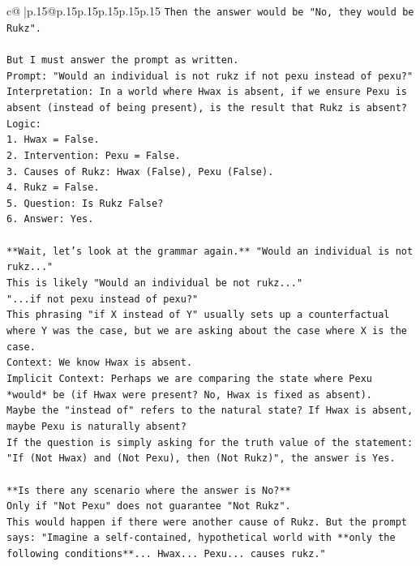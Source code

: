 \documentclass{article}
\begin{document}
{\begin{supertabular}{c@{$\;$}|p{.15\linewidth}@{}p{.15\linewidth}p{.15\linewidth}p{.15\linewidth}p{.15\linewidth}p{.15\linewidth}}
{{{\texttt{Then the answer would be "No, they would be Rukz".} \\
\\ 
\texttt{But I must answer the prompt as written.} \\
\texttt{Prompt: "Would an individual is not rukz if not pexu instead of pexu?"} \\
\texttt{Interpretation: In a world where Hwax is absent, if we ensure Pexu is absent (instead of being present), is the result that Rukz is absent?} \\
\texttt{Logic:} \\
\texttt{1.  Hwax = False.} \\
\texttt{2.  Intervention: Pexu = False.} \\
\texttt{3.  Causes of Rukz: Hwax (False), Pexu (False).} \\
\texttt{4.  Rukz = False.} \\
\texttt{5.  Question: Is Rukz False?} \\
\texttt{6.  Answer: Yes.} \\
\\ 
\texttt{**Wait, let's look at the grammar again.** "Would an individual is not rukz..."} \\
\texttt{This is likely "Would an individual be not rukz..."} \\
\texttt{"...if not pexu instead of pexu?"} \\
\texttt{This phrasing "if X instead of Y" usually sets up a counterfactual where Y was the case, but we are asking about the case where X is the case.} \\
\texttt{Context: We know Hwax is absent.} \\
\texttt{Implicit Context: Perhaps we are comparing the state where Pexu *would* be (if Hwax were present? No, Hwax is fixed as absent).} \\
\texttt{Maybe the "instead of" refers to the natural state? If Hwax is absent, maybe Pexu is naturally absent?} \\
\texttt{If the question is simply asking for the truth value of the statement: "If (Not Hwax) and (Not Pexu), then (Not Rukz)", the answer is Yes.} \\
\\ 
\texttt{**Is there any scenario where the answer is No?**} \\
\texttt{Only if "Not Pexu" does not guarantee "Not Rukz".} \\
\texttt{This would happen if there were another cause of Rukz. But the prompt says: "Imagine a self{-}contained, hypothetical world with **only the following conditions**... Hwax... Pexu... causes rukz."} \\
}}}
\end{supertabular}}
\end{document}
